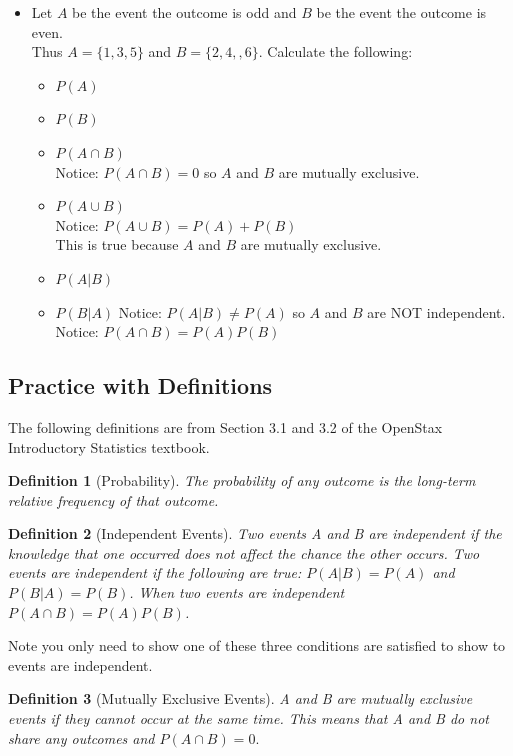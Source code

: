 \documentclass{article}
\theoremstyle{plain}
\theoremstyle{box}
\newtheorem*{definition*}{Definition}
\begin{document}
\begin{itemize}
\item Let $A$ be the event the outcome is odd and $B$ be the event the outcome is even.\\
Thus $A = \{1,3,5\}$ and $B = \{2,4,,6\}$. Calculate the following:
\begin{itemize}
\item $P(A)$
\item $P(B)$
\item $P(A \cap B)$\\
Notice: $P(A \cap B) = 0$ so $A$ and $B$ are mutually exclusive.
\item $P(A \cup B)$\\
Notice: $P(A \cup B) = P(A) + P(B)$\\
This is true because $A$ and $B$ are mutually exclusive.
\item $P(A|B)$
\item $P(B|A)$
Notice: $P(A|B) \neq P(A)$ so $A$ and $B$ are NOT independent.\\
Notice: $P(A \cap B) = P(A)P(B)$
\end{itemize}
\end{itemize}



\newpage
\subsection{Practice with Definitions}
The following definitions are from Section 3.1 and 3.2 of the OpenStax Introductory Statistics textbook.
\begin{definition*}[Probability]
The probability of any outcome is the long-term relative frequency of that outcome.
\end{definition*}

\begin{definition*}[Independent Events]
Two events A and B are independent if the knowledge that one occurred does not affect the chance the other occurs. Two events are independent if the following are true: $P(A|B) = P(A)$ and $P(B|A) = P(B)$. When two events are independent $P(A \cap B) = P(A)P(B)$.
\end{definition*}
Note you only need to show one of these three conditions are satisfied to show to events are independent.

\begin{definition*}[Mutually Exclusive Events]
A and B are mutually exclusive events if they cannot occur at the same time. This means that A and B do not share any outcomes and $P(A \cap B) = 0.$
\end{definition*}
\end{document}
